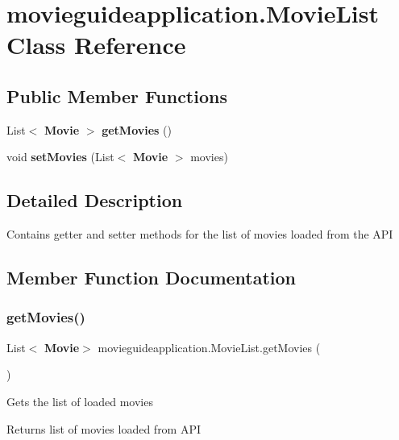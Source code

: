 \section{movieguideapplication.\+Movie\+List Class Reference}
\label{classmovieguideapplication_1_1_movie_list}
\subsection*{Public Member Functions}
\begin{DoxyCompactItemize}
\item 
List$<$ \textbf{ Movie} $>$ \textbf{ get\+Movies} ()
\item 
void \textbf{ set\+Movies} (List$<$ \textbf{ Movie} $>$ movies)
\end{DoxyCompactItemize}


\subsection{Detailed Description}
Contains getter and setter methods for the list of movies loaded from the A\+PI 

\subsection{Member Function Documentation}
\mbox{\label{classmovieguideapplication_1_1_movie_list_a9bf964c6de477d41c348973ff3499744}} 
\subsubsection{get\+Movies()}
{\footnotesize\ttfamily List$<$\textbf{ Movie}$>$ movieguideapplication.\+Movie\+List.\+get\+Movies (\begin{DoxyParamCaption}{ }\end{DoxyParamCaption})}

Gets the list of loaded movies \begin{DoxyReturn}{Returns}
list of movies loaded from A\+PI 
\end{DoxyReturn}
\mbox{\label{classmovieguideapplication_1_1_movie_list_a191cca47a9510755f460ebe137279234}} 
